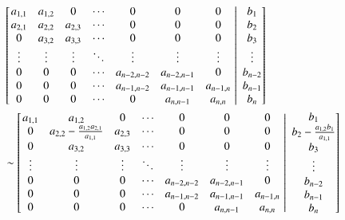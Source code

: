 \documentclass[11pt,english,a4paper]{article}
\begin{document}
\begin{flushleft}
\begin{align*}
&\kl{\left.\begin{matrix} a_{1,1} & a_{1,2} & 0 & \cdots & 0 & 0 & 0 \\ a_{2,1} & a_{2,2} & a_{2,3} & \cdots & 0 & 0 & 0\\ 0 & a_{3,2} & a_{3,3} & \cdots & 0 & 0 & 0\\ \vdots & \vdots & \vdots  & \ddots & \vdots & \vdots & \vdots \\ 0 & 0 & 0 & \cdots & a_{n-2,n-2} & a_{n-2,n-1} & 0 \\ 0 & 0 & 0 & \cdots & a_{n-1,n-2} & a_{n-1,n-1} & a_{n-1,n} \\ 0 & 0 & 0 &\cdots & 0 & a_{n,n-1} & a_{n,n} \end{matrix}\,\,\right\vert\,\,\begin{matrix} b_1 \\ b_2 \\ b_3 \\ \vdots \\ b_{n-2} \\ b_{n-1} \\ b_n\end{matrix}} 
\\
&\sim \kl{\left.\begin{matrix} a_{1,1} & a_{1,2} & 0 & \cdots & 0 & 0 & 0 \\ 0 & a_{2,2} - \frac{a_{1,2}a_{2,1}}{a_{1,1}} & a_{2,3} & \cdots & 0 & 0 & 0\\ 0 & a_{3,2} & a_{3,3} & \cdots & 0 & 0 & 0\\ \vdots & \vdots & \vdots  & \ddots & \vdots & \vdots & \vdots \\ 0 & 0 & 0 & \cdots & a_{n-2,n-2} & a_{n-2,n-1} & 0 \\ 0 & 0 & 0 & \cdots & a_{n-1,n-2} & a_{n-1,n-1} & a_{n-1,n} \\ 0 & 0 & 0 &\cdots & 0 & a_{n,n-1} & a_{n,n} \end{matrix}\,\,\right\vert\,\,\begin{matrix} b_1 \\ b_2 - \frac{a_{1,2} b_1}{a_{1,1}} \\ b_3 \\ \vdots \\ b_{n-2} \\ b_{n-1} \\ b_n\end{matrix}}
\\

\end{align*}
\end{flushleft}
\end{document}
